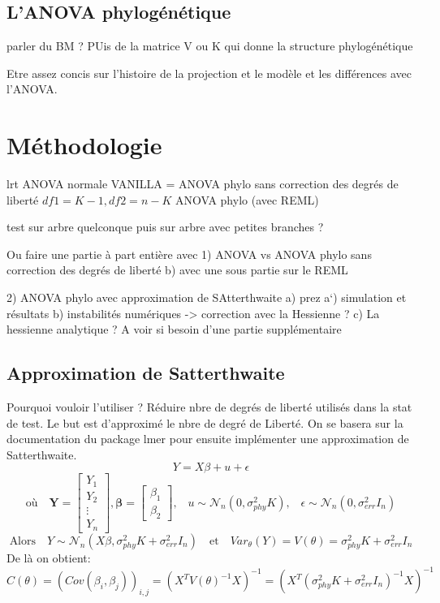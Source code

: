 \documentclass[a4paper, 12pt]{article}\usepackage[]{graphicx}\usepackage[]{xcolor}
\begin{document}

\subsection{L'ANOVA phylogénétique}

parler du BM ? 
PUis de la matrice V ou K qui donne la structure phylogénétique 

Etre assez concis sur l'histoire de la projection et le modèle et les différences avec l'ANOVA. 

\section{Méthodologie}
\label{chap:metho}
lrt 
ANOVA normale 
VANILLA = ANOVA phylo sans correction des degrés de liberté $df1 = K - 1, df2 = n-K$
ANOVA phylo (avec REML)

test sur arbre quelconque
puis sur arbre avec petites branches ? 

Ou faire une partie à part entière avec 
1) ANOVA vs ANOVA phylo sans correction des degrés de liberté
 b) avec une sous partie sur le REML

2) ANOVA phylo avec approximation de SAtterthwaite 
 a) prez
 a`) simulation et résultats 
 b) instabilités numériques -> correction avec la Hessienne ? 
 c) La hessienne analytique ? A voir si besoin d'une partie supplémentaire
 
\subsection{Approximation de Satterthwaite}
Pourquoi vouloir l'utiliser ? Réduire nbre de degrés de liberté utilisés dans la stat de test. 
Le but est d'approximé le nbre de degré de Liberté. 
On se basera sur la documentation du package lmer \cite{kuznetsovaLmerTestPackageTests2017} pour ensuite implémenter une approximation de Satterthwaite. 
\begin{equation}
    Y = X\beta + u + \epsilon 
\end{equation} 
\[
\text{où} \quad \mathbf{Y} = \begin{bmatrix} Y_1 \\ Y_2 \\ \vdots \\ Y_n \end{bmatrix}, \mathbf{\beta} = \begin{bmatrix} \beta_1 \\ \beta_2  \end{bmatrix}\text{,} \quad u \sim \mathcal{N}_n(0, \sigma^2_{phy}K) \text{,} \quad \epsilon \sim \mathcal{N}_n(0, \sigma^2_{err}I_n)
\]
\newline
\[
 \text{Alors} \quad Y \sim \mathcal{N}_n(X\beta, \sigma^2_{phy}K + \sigma^2_{err}I_n) \quad \text{et} \quad Var_\theta(Y) = V(\theta) = \sigma^2_{phy}K + \sigma^2_{err}I_n
\]
De là on obtient:
\begin{equation}
    C(\theta) = (Cov(\beta_i , \beta_j))_{i,j} = (X^TV(\theta)^{-1}X)^{-1} = (X^T(\sigma^2_{phy}K + \sigma^2_{err}I_n)^{-1}X)^{-1}
\end{equation}
\end{document}
